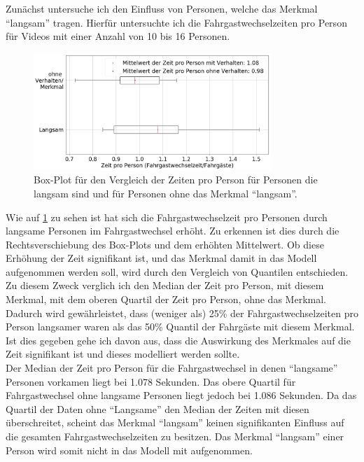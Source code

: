 Zunächst untersuche ich den Einfluss von Personen, welche das Merkmal "`langsam"' tragen. Hierfür untersuchte ich die Fahrgastwechselzeiten pro Person für Videos mit einer Anzahl von 10 bis 16 Personen.
\begin{figure}[H]
	\centering
		\includegraphics[width=0.8\textwidth]{pictures/data_evaluation/behavior/comp_Langsam.png}
	\caption{Box-Plot für den Vergleich der Zeiten pro Person für Personen die langsam sind und für Personen ohne das Merkmal "`langsam"'.}
	\label{fig:BoxPlotLangsam}
\end{figure}
Wie auf \figurename \ref{fig:BoxPlotLangsam} zu sehen ist hat sich die Fahrgastwechselzeit pro Personen durch langsame Personen im Fahrgastwechsel erhöht. Zu erkennen ist dies durch die Rechtsverschiebung des Box-Plots und dem erhöhten Mittelwert. Ob diese Erhöhung der Zeit signifikant ist, und das Merkmal damit in das Modell aufgenommen werden soll, wird durch den Vergleich von Quantilen entschieden. Zu diesem Zweck verglich ich den Median der Zeit pro Person, mit diesem Merkmal, mit dem oberen Quartil der Zeit pro Person, ohne das Merkmal. Dadurch wird gewährleistet, dass (weniger als) 25\% der Fahrgastwechselzeiten pro Person langsamer waren als das 50\% Quantil der Fahrgäste mit diesem Merkmal. Ist dies gegeben gehe ich davon aus, dass die Auswirkung des Merkmales auf die Zeit signifikant ist und dieses modelliert werden sollte.\\
Der Median der Zeit pro Person für die Fahrgastwechsel in denen "`langsame"' Personen vorkamen liegt bei 1.078 Sekunden. Das obere Quartil für Fahrgastwechsel ohne langsame Personen liegt jedoch bei 1.086 Sekunden. Da das Quartil der Daten ohne "`Langsame"' den Median der Zeiten mit diesen überschreitet, scheint das Merkmal "`langsam"' keinen signifikanten Einfluss auf die gesamten Fahrgastwechselzeiten zu besitzen. Das Merkmal "`langsam"' einer Person wird somit nicht in das Modell mit aufgenommen.

